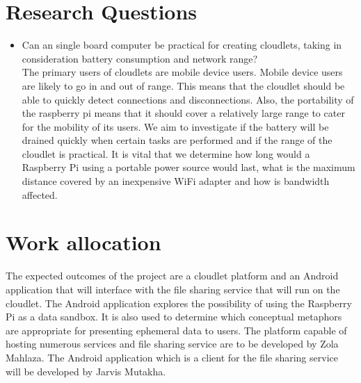 \section{Research Questions}

\begin{itemize}


\item Can an single board computer be practical for creating cloudlets, taking in consideration battery consumption and network range?\\

The primary users of cloudlets are mobile device users. Mobile device users are likely to go in and out of range. This means that the cloudlet
should be able to quickly detect connections and disconnections. Also, the portability of the raspberry pi means that it should cover a relatively large range to cater for the mobility of its users. We aim to investigate if the battery will be drained quickly when certain tasks are performed and if the range of the cloudlet is practical. It is vital that we determine how long would a Raspberry Pi using a portable power source would last, what is the maximum distance covered by an inexpensive WiFi adapter and how is bandwidth affected.
\end{itemize}

\section{Work allocation}
The expected outcomes of the project are a cloudlet platform and an Android application that will interface with the file sharing service that will run on the cloudlet. The Android application explores the possibility of using the Raspberry Pi as a data sandbox. It is also used to determine which conceptual metaphors are appropriate for presenting ephemeral data to users. The platform capable of hosting numerous services and file sharing service are to be developed by Zola Mahlaza. The Android application which is a client for the file sharing service will be developed by Jarvis Mutakha.

